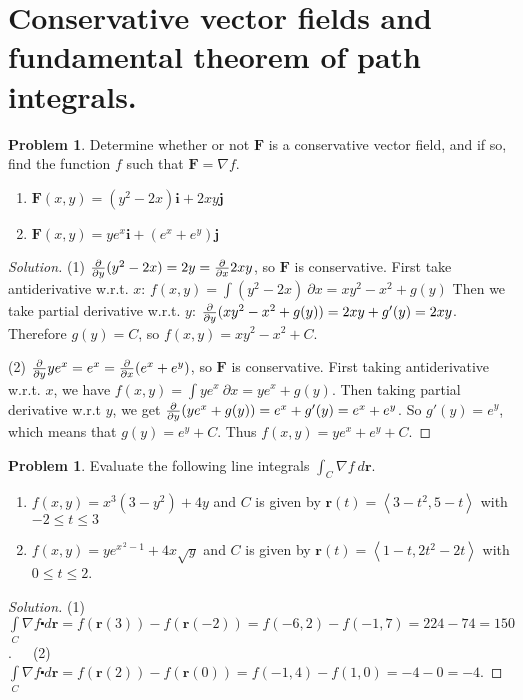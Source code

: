 \documentclass[12pt]{amsart}%
\theoremstyle{plain}
\theoremstyle{definition}
\newtheorem{prob}[theorem]{Problem}
\theoremstyle{special}
\newcommand{\sol}[1]{
{\begin{proof}[Solution]#1\end{proof}}
}
\newcommand{\Prob}[1]{\begin{tcolorbox}%
\begin{prob}
	#1
\end{prob}
\end{tcolorbox}	
}
\renewcommand{\vec}{\mathbf}
\begin{document}
\section{Conservative vector fields and fundamental theorem of path integrals.}
\Prob{Determine whether or not $\mathbf{F}$ is a conservative vector field, and if so, find the function $f$ such that $\mathbf{F}=\nabla f$.
\begin{enumerate}
	\item $\displaystyle \vec{F}(x,y)=(y^2-2x)\vec{i}+2xy\vec{j}$
	\item $\displaystyle \vec{F}(x,y)=ye^x\vec{i}+(e^x+e^y)\vec{j}$
\end{enumerate}}
\sol{
(1) ${\partial\over \partial y}(y^2-2x)=2y={\partial\over \partial x}2xy$, so $\vec F$ is conservative. First take antiderivative w.r.t. $x$:
\(f(x,y)=\int (y^2-2x)\ \partial x=xy^2-x^2+g(y)\)
Then we take partial derivative w.r.t. $y$: \({\partial\over \partial y}(xy^2-x^2+g(y))=2xy+g'(y)=2xy\).
Therefore $g(y)=C$, so $f(x,y)=xy^2-x^2+C$.

(2) ${\partial\over\partial y}ye^x=e^x={\partial\over\partial x}(e^x+e^y) $, so $\vec F$ is conservative. First taking antiderivative w.r.t. $x$, we have
\(f(x,y)=\int ye^x\ \partial x=ye^x+g(y)\). Then taking partial derivative w.r.t $y$, we get
\({\partial\over\partial y}(ye^x+g(y))=e^x+g'(y)=e^x+e^y\).
So $g'(y)=e^y$, which means that $g(y)=e^y+C$. Thus $f(x,y)=ye^x+e^y+C$.
}
\Prob{Evaluate the following line integrals $\int_C\nabla f\ d\vec r$.
\begin{enumerate}
	\item $f\left( {x,y} \right) = {x^3}\left( {3 - {y^2}} \right) + 4y$ and $C$ is given by $\vec r\left( t \right) = \left\langle {3 - {t^2},5 - t} \right\rangle
$ with $-2\leq t\leq 3$
\item $f\left( {x,y} \right) = y{e^{{x^{\,2}} - 1}} + 4x\sqrt y$ and $C$ is given by $\vec r\left( t \right) = \left\langle {1 - t,2{t^2} - 2t} \right\rangle$ with $0\leq t\leq 2$.
\end{enumerate}}
\sol{
(1) $  \int\limits_{C}{{\nabla f\centerdot d\vec r}} = f\left( {\vec r\left( 3 \right)} \right) - f\left( {\vec r\left( { - 2} \right)} \right) = f\left( { - 6,2} \right) - f\left( { - 1,7} \right) = 224 - 74 = {{150}}
$.\ \ \ 
(2) $ \int\limits_{C}{{\nabla f\centerdot d\vec r}} = f\left( {\vec r\left( 2 \right)} \right) - f\left( {\vec r\left( 0 \right)} \right) = f\left( { - 1,4} \right) - f\left( {1,0} \right) =  - 4 - 0 = {{ - 4}}$.
}
\end{document}
